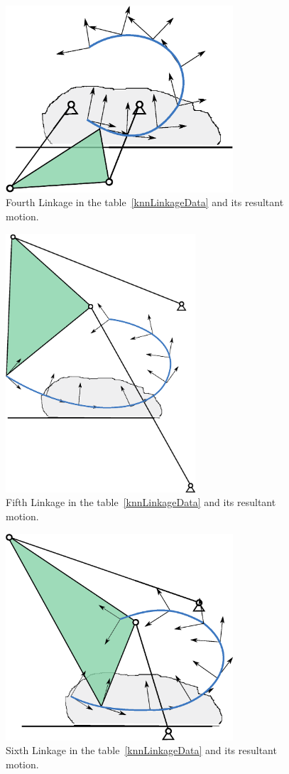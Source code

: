 \documentclass[twocolumn,10pt]{asme2e}
\begin{document}
\begin{figure}
\centering
\includegraphics[width=240pt]{figure/sol4.eps}
  \caption{Fourth Linkage in the table~\ref{knnLinkageData} and its resultant motion.}
\label{knnSol4}
\end{figure}

\begin{figure}
\centering
\includegraphics[width=200pt]{figure/sol5.eps}
  \caption{Fifth Linkage in the table~\ref{knnLinkageData} and its resultant motion.}
\label{knnSol5}
\end{figure}

\begin{figure}
\centering
\includegraphics[width=240pt]{figure/sol6.eps}
  \caption{Sixth Linkage in the table~\ref{knnLinkageData} and its resultant motion.}
\label{knnSol6}
\end{figure}
\end{document}
